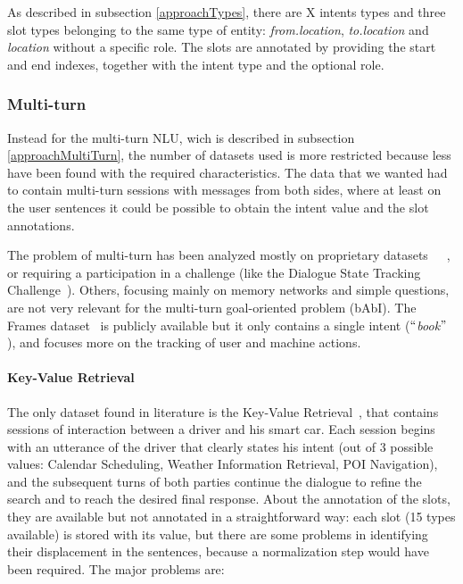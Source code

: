 As described in subsection \ref{approachTypes}, there are X intents types and three slot types belonging to the same type of entity: \textit{from.location}, \textit{to.location} and \textit{location} without a specific role. The slots are annotated by providing the start and end indexes, together with the intent type and the optional role.

\subsubsection{Multi-turn}
Instead for the multi-turn NLU, wich is described in subsection \ref{approachMultiTurn}, the number of datasets used is more restricted because less have been found with the required characteristics. The data that we wanted had to contain multi-turn sessions with messages from both sides, where at least on the user sentences it could be possible to obtain the intent value and the slot annotations.

The problem of multi-turn has been analyzed mostly on proprietary datasets~\cite{shi2015contextual}~\cite{xu2014contextual}~\cite{bhargava2013easy}, or requiring a participation in a challenge (like the Dialogue State Tracking Challenge~\cite{williams2013dialog}). Others, focusing mainly on memory networks and simple questions, are not very relevant for the multi-turn goal-oriented problem (bAbI). The Frames dataset~\cite{asri2017frames} is publicly available but it only contains a single intent ($``$\textit{book}$"$ ), and focuses more on the tracking of user and machine actions.

\paragraph{Key-Value Retrieval}
The only dataset found in literature is the Key-Value Retrieval~\cite{eric2017key}, that contains sessions of interaction between a driver and his smart car. Each session begins with an utterance of the driver that clearly states his intent (out of 3 possible values: Calendar Scheduling, Weather Information Retrieval, POI Navigation), and the subsequent turns of both parties continue the dialogue to refine the search and to reach the desired final response. About the annotation of the slots, they are available but not annotated in a straightforward way: each slot (15 types available) is stored with its value, but there are some problems in identifying their displacement in the sentences, because a normalization step would have been required. The major problems are:

